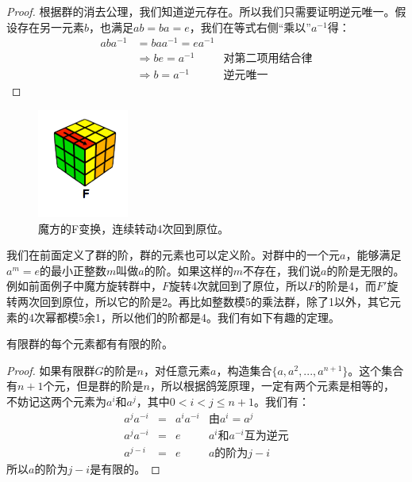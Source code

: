 \documentclass[b5paper]{ctexart}
\begin{document}
\begin{proof}
根据群的消去公理，我们知道逆元存在。所以我们只需要证明逆元唯一。假设存在另一元素$b$，也满足$ab = ba = e$，我们在等式右侧“乘以”$a^{-1}$得：
\[
\begin{array}{rll}
aba^{-1} & = baa^{-1} = ea^{-1} & \\
& \Rightarrow be = a^{-1} & \text{对第二项用结合律} \\
& \Rightarrow b = a^{-1} & \text{逆元唯一}
\end{array}
\]
\end{proof}

\begin{figure}[htbp]
 \centering
 \includegraphics[scale=1.0]{img/Rubik-cube-F.png}
 \caption{魔方的F变换，连续转动4次回到原位。}
 \label{fig:Rubik-cube-F}
\end{figure}

我们在前面定义了群的阶，群的元素也可以定义阶。对群中的一个元$a$，能够满足$a^m = e$的最小正整数$m$叫做$a$的阶。如果这样的$m$不存在，我们说$a$的阶是无限的。例如前面例子中魔方旋转群中，$F$旋转4次就回到了原位，所以$F$的阶是4，而$F'$旋转两次回到原位，所以它的阶是2。再比如整数模5的乘法群，除了1以外，其它元素的4次幂都模5余1，所以他们的阶都是4。我们有如下有趣的定理。

\begin{theorem}
有限群的每个元素都有有限的阶。
\end{theorem}

\begin{proof}
如果有限群$G$的阶是$n$，对任意元素$a$，构造集合$\{a, a^2, ..., a^{n+1}\}$。这个集合有$n+1$个元，但是群的阶是$n$，所以根据鸽笼原理，一定有两个元素是相等的， 不妨记这两个元素为$a^i$和$a^j$，其中$0 < i < j \leq n + 1$。我们有：
\[
\begin{array}{rcll}
a^ja^{-i} & = & a^{i}a^{-i} & \text{由} a^i = a^j \\
a^ja^{-i} & = & e & \text{$a^i$和$a^{-i}$互为逆元} \\
a^{j-i} & = & e & a\text{的阶为} j - i
\end{array}
\]
所以$a$的阶为$j-i$是有限的。
\end{proof}
\end{document}

